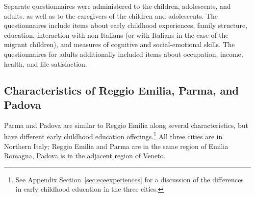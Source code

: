 Separate questionnaires were administered to the children, adolescents, and adults. as well as to the caregivers of the children and adolescents. The questionnaires include items about early childhood experiences, family structure, education, interaction with non-Italians (or with Italians in the case of the migrant children), and measures of cognitive and social-emotional skills. The questionnaires for adults additionally included items about occupation, income, health, and life satisfaction. 


\begin{table}[H]
\centering
{}
\end{table}



%

\subsection{Characteristics of Reggio Emilia, Parma, and Padova}

Parma and Padova are similar to Reggio Emilia along several characteristics, but have different early childhood education offerings.\footnote{See Appendix Section~\ref{sec:eceexperiences} for a discussion of the differences in early childhood education in the three cities.} All three cities are in Northern Italy; Reggio Emilia and Parma are in the same region of Emilia Romagna, Padova is in the adjacent region of Veneto. 

